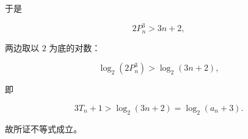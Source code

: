 \begin{answer}
于是

\nopagebreak[4]
\[2P_n^3>3n+2,\]

两边取以 $2$ 为底的对数：

\nopagebreak[4]
\[\log_2(2P_n^3)>\log_2(3n+2),\]

即

\nopagebreak[4]
\[3T_n+1>\log_2(3n+2)=\log_2(a_n+3).\]

故所证不等式成立。


\end{answer}